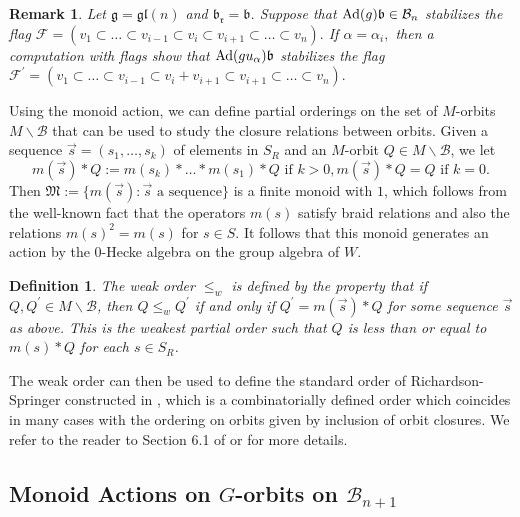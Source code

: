 \documentclass[12pt]{amsart}
\numberwithin{equation}{section}
\newtheorem{rem}[thm]{Remark}
\newtheorem{dfn}[thm]{Definition}
\newcommand{\fg}{\mbox{${\mathfrak g}$}}
\newcommand{\fr}{\mbox{${\mathfrak r}$}}
\newcommand{\fb}{\mbox{${\mathfrak b}$}}
\newcommand{\Ad}{{\rm Ad}}
\newcommand{\fgl}{\mathfrak{gl}}
\newcommand{\B}{\mathcal{B}}
\newcommand{\F}{\mathcal{F}}
\begin{document}
\begin{rem}\label{r:Cayley}
Let $\fg=\fgl(n)$ and $\fb_{\fr}=\fb$.  Suppose that 
$\Ad(g)\fb\in\B_{n}$ stabilizes the flag $\F=(v_{1}\subset \dots\subset v_{i-1}\subset v_{i}\subset v_{i+1}\subset \dots\subset v_{n}).$  If $\alpha=\alpha_{i},$
 then a computation with flags 
show that $\Ad(gu_{\alpha})\fb$ stabilizes the flag 
$\F^{\prime}=(v_{1}\subset\dots\subset v_{i-1}\subset v_{i}+v_{i+1}\subset v_{i+1}\subset \dots \subset v_{n}).$ 
\end{rem}


Using the monoid action, we can define partial orderings on the set of $M$-orbits 
$M\backslash\B$ that can be used to study the closure relations between orbits.  
Given a sequence $\vec{s}=(s_{1},\dots, s_{k})$ of elements in $S_{R}$ and 
an $M$-orbit $Q\in M\backslash\B$, we let 
\begin{equation} \label{eq:Ssequence}
m(\vec{s})*Q:=m(s_{k})*\dots *m(s_{1})*Q \mbox{ if } k > 0, m(\vec{s})*Q=Q \mbox{ if } k = 0.
\end{equation}
 Then $\mathfrak{M}:=\{ m(\vec{s}): \vec{s} \mbox{ a sequence} \} $ is a finite monoid with $1$, which follows from the well-known fact that the operators $m(s)$ satisfy  braid relations and also the relations $m(s)^{2}=m(s)$ for $s\in S.$  It follows that this monoid generates an action by the $0$-Hecke algebra on the group algebra of $W.$

\begin{dfn}\label{d:weak}
The \emph{weak order } $\leq_w$ is defined by the property that if $Q, Q^{\prime} \in M\backslash\B$, then $Q \leq_w Q^{\prime}$ if and only if $Q^{\prime}=m(\vec{s})*Q$ for some sequence $\vec{s}$ as above.  This is the weakest partial order such that $Q$ is less than or equal to $m(s)*Q$ for each $s\in S_{R}$.%
\end{dfn}


The weak order can then be used to define the standard order of Richardson-Springer constructed in \cite{RS}, which is a combinatorially defined order which coincides in many cases with the ordering on orbits given by inclusion of orbit closures.  We refer to the reader to Section 6.1 of \cite{CE21II} or \cite{RS} for more details. 


\subsection{Monoid Actions on $G$-orbits on $\B_{n+1}$}\label{ss:Gmonoid}
\end{document}
